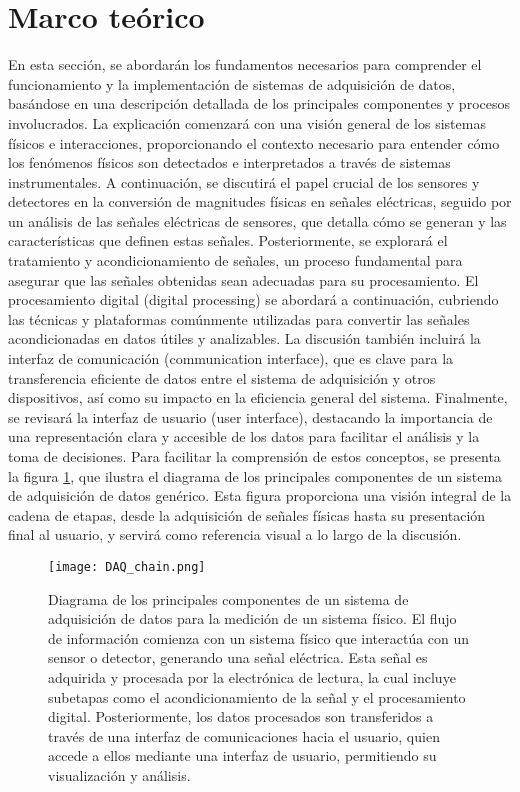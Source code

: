 \documentclass{report}
\begin{document}
\section{Marco teórico}
\noindent En esta sección, se abordarán los fundamentos necesarios para comprender el funcionamiento y la implementación de sistemas de adquisición de datos, basándose en una descripción detallada de los principales componentes y procesos involucrados. La explicación comenzará con una visión general de los sistemas físicos e interacciones, proporcionando el contexto necesario para entender cómo los fenómenos físicos son detectados e interpretados a través de sistemas instrumentales. A continuación, se discutirá el papel crucial de los sensores y detectores en la conversión de magnitudes físicas en señales eléctricas, seguido por un análisis de las señales eléctricas de sensores, que detalla cómo se generan y las características que definen estas señales. Posteriormente, se explorará el tratamiento y acondicionamiento de señales, un proceso fundamental para asegurar que las señales obtenidas sean adecuadas para su procesamiento. El procesamiento digital (digital processing) se abordará a continuación, cubriendo las técnicas y plataformas comúnmente utilizadas para convertir las señales acondicionadas en datos útiles y analizables. La discusión también incluirá la interfaz de comunicación (communication interface), que es clave para la transferencia eficiente de datos entre el sistema de adquisición y otros dispositivos, así como su impacto en la eficiencia general del sistema. Finalmente, se revisará la interfaz de usuario (user interface), destacando la importancia de una representación clara y accesible de los datos para facilitar el análisis y la toma de decisiones. Para facilitar la comprensión de estos conceptos, se presenta la figura \ref{fig:DAQ_generic}, que ilustra el diagrama de los principales componentes de un sistema de adquisición de datos genérico. Esta figura proporciona una visión integral de la cadena de etapas, desde la adquisición de señales físicas hasta su presentación final al usuario, y servirá como referencia visual a lo largo de la discusión.

\begin{figure}[h]
    \centering
    \texttt{[image: DAQ\_chain.png]}
    \caption{Diagrama de los principales componentes de un sistema de adquisición de datos para la medición de un sistema físico. El flujo de información comienza con un sistema físico que interactúa con un sensor o detector, generando una señal eléctrica. Esta señal es adquirida y procesada por la electrónica de lectura, la cual incluye subetapas como el acondicionamiento de la señal y el procesamiento digital. Posteriormente, los datos procesados son transferidos a través de una interfaz de comunicaciones hacia el usuario, quien accede a ellos mediante una interfaz de usuario, permitiendo su visualización y análisis.}
    \label{fig:DAQ_generic}

\end{figure}
\end{document}
